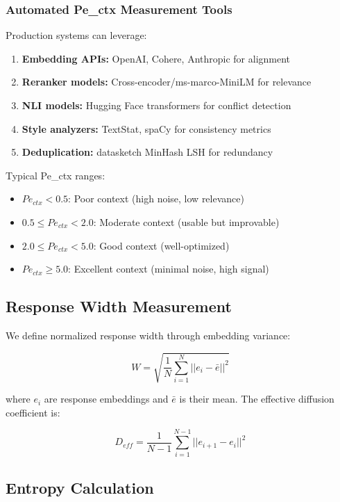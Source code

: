 \documentclass[conference]{IEEEtran}
\begin{document}
\subsubsection{Automated Pe\_ctx Measurement Tools}

Production systems can leverage:

\begin{enumerate}
\item \textbf{Embedding APIs:} OpenAI, Cohere, Anthropic for alignment
\item \textbf{Reranker models:} Cross-encoder/ms-marco-MiniLM for relevance
\item \textbf{NLI models:} Hugging Face transformers for conflict detection
\item \textbf{Style analyzers:} TextStat, spaCy for consistency metrics
\item \textbf{Deduplication:} datasketch MinHash LSH for redundancy
\end{enumerate}

Typical Pe\_ctx ranges:
\begin{itemize}
\item $Pe_{ctx} < 0.5$: Poor context (high noise, low relevance)
\item $0.5 \leq Pe_{ctx} < 2.0$: Moderate context (usable but improvable)
\item $2.0 \leq Pe_{ctx} < 5.0$: Good context (well-optimized)
\item $Pe_{ctx} \geq 5.0$: Excellent context (minimal noise, high signal)
\end{itemize}

\subsection{Response Width Measurement}

We define normalized response width through embedding variance:

\begin{equation}
W = \sqrt{\frac{1}{N}\sum_{i=1}^{N}||e_i - \bar{e}||^2}
\end{equation}

where $e_i$ are response embeddings and $\bar{e}$ is their mean. The effective diffusion coefficient is:

\begin{equation}
D_{eff} = \frac{1}{N-1}\sum_{i=1}^{N-1}||e_{i+1} - e_i||^2
\end{equation}

\subsection{Entropy Calculation}
\end{document}
